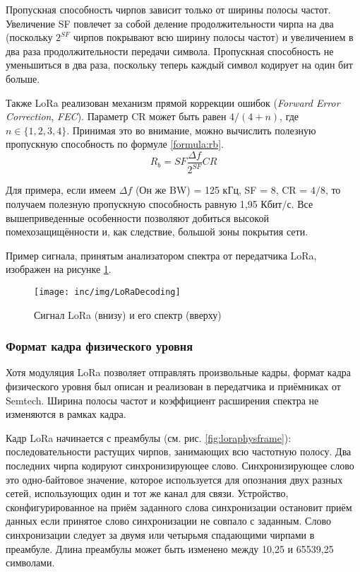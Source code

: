 Пропускная способность чирпов зависит только от ширины полосы частот.
Увеличение SF повлечет за собой деление продолжительности чирпа на два (поскольку $2^{SF}$ чирпов покрывают всю ширину полосы частот) и увеличением в два раза продолжительности передачи символа.
Пропускная способность не уменьшиться в два раза, поскольку теперь каждый символ кодирует на один бит больше.

Также LoRa реализован механизм прямой коррекции ошибок (\textit{Forward Error Correction}, \textit{FEC}).
Параметр CR может быть равен $4/(4+n)$, где $n \in \{1, 2, 3, 4\}$.
Принимая это во внимание, можно вычислить полезную пропускную способность по формуле \ref{formula:rb}.
\begin{equation}
 R_b = SF \frac{\Delta f}{2^{SF}} CR \label{formula:rb}
\end{equation}

Для примера, если имеем $\Delta f$ (Он же BW) = 125 кГц, SF = 8, CR = $4/8$, то 
получаем полезную пропускную способность равную 1,95 Кбит/с.
Все вышеприведенные особенности позволяют добиться высокой помехозащищённости и, как следствие, большой зоны покрытия сети.

Пример сигнала, принятым анализатором спектра от передатчика LoRa, изображен на рисунке \ref{fig:loradecoding}.

\begin{figure}[!h]
  \centering
  \texttt{[image: inc/img/LoRaDecoding]}
  \caption{Сигнал LoRa (внизу) и его спектр (вверху) \cite{DecodingLora2018}}
  \label{fig:loradecoding}
\end{figure}

\subsubsection{Формат кадра физического уровня}\label{part:physframe}

Хотя модуляция LoRa позволяет отправлять произвольные кадры, формат кадра физического уровня был описан и реализован в передатчика и приёмниках от Semtech.
Ширина полосы частот и коэффициент расширения спектра не изменяются в рамках кадра.

Кадр LoRa начинается с преамбулы (см. рис. \ref{fig:loraphysframe}): 
последовательности растущих чирпов, занимающих всю частотную полосу.
Два последних чирпа кодируют синхронизирующее слово.
Синхронизирующее слово это одно-байтовое значение, которое используется для опознания двух разных сетей, использующих один и тот же канал для связи. 
Устройство, сконфигурированное на приём заданного слова синхронизации остановит приём данных если принятое слово синхронизации не совпало с заданным.
Слово синхронизации следует за двумя или четырьмя спадающими чирпами в преамбуле.
Длина преамбулы может быть изменено между 10,25 и 65539,25 символами.


